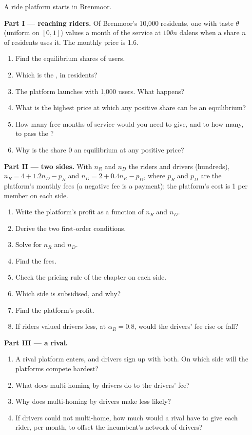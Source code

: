 \begin{problem}\label{pb:b3:platforms-and-innovation:ride}
A ride platform starts in Brenmoor. %

\medskip\noindent\textbf{Part I --- reaching riders.} Of Brenmoor's 10{,}000 residents, one
with taste $\theta$ (uniform on $[0, 1]$) values a month of the service at $10\theta n$ dalens when a share $n$ of residents
uses it. The monthly price is 1.6.
\begin{enumerate}
\item Find the equilibrium shares of users.
\item Which is the , in residents?
\item The platform launches with 1{,}000 users. What happens?
\item What is the highest price at which any positive share can be an equilibrium?
\item How many free months of service would you need to give, and to how many, to
pass the ?
\item Why is the share 0 an equilibrium at any positive price?
\end{enumerate}

\medskip\noindent\textbf{Part II --- two sides.} With $n_R$ and $n_D$ the riders and drivers (hundreds),
$n_R = 4 + 1.2n_D - p_R$ and $n_D = 2 + 0.4n_R - p_D$, where $p_R$ and $p_D$ are the platform's monthly fees (a negative fee is
a payment); the platform's cost is 1 per member on each side.
\begin{enumerate}[resume]
\item Write the platform's profit as a function of $n_R$ and $n_D$.
\item Derive the two first-order conditions.
\item Solve for $n_R$ and $n_D$.
\item Find the fees.
\item Check the pricing rule of the chapter on each side.
\item Which side is subsidised, and why?
\item Find the platform's profit.
\item If riders valued drivers less, at $\alpha_R = 0.8$, would the drivers' fee rise or fall?
\end{enumerate}

\medskip\noindent\textbf{Part III --- a rival.}
\begin{enumerate}[resume]
\item A rival platform enters, and drivers sign up with both. On which side will the
platforms compete hardest?
\item What does multi-homing by drivers do to the drivers' fee?
\item Why does multi-homing by drivers make  less likely?
\item If drivers could not multi-home, how much would a rival have to give each rider, per month,
to offset the incumbent's network of drivers?
\end{enumerate}


\end{problem}
